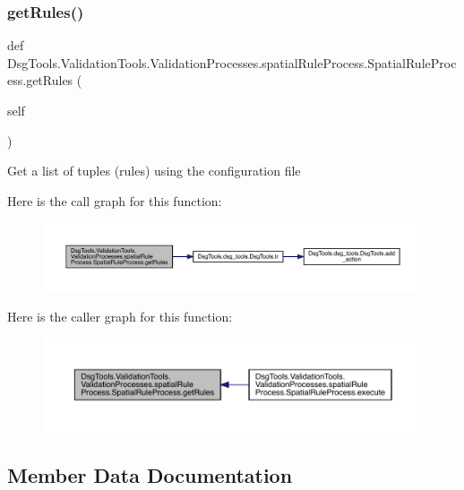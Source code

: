 \subsubsection{\texorpdfstring{get\+Rules()}{getRules()}}
{\footnotesize\ttfamily def Dsg\+Tools.\+Validation\+Tools.\+Validation\+Processes.\+spatial\+Rule\+Process.\+Spatial\+Rule\+Process.\+get\+Rules (\begin{DoxyParamCaption}\item[{}]{self }\end{DoxyParamCaption})}

\begin{DoxyVerb}Get a list of tuples (rules) using the configuration file
\end{DoxyVerb}
 Here is the call graph for this function\+:
\nopagebreak
\begin{figure}[H]
\begin{center}
\leavevmode
\includegraphics[width=350pt]{class_dsg_tools_1_1_validation_tools_1_1_validation_processes_1_1spatial_rule_process_1_1_spatial_rule_process_a21613a30ab73453e3d72c0553ac1f2d6_cgraph}
\end{center}
\end{figure}
Here is the caller graph for this function\+:
\nopagebreak
\begin{figure}[H]
\begin{center}
\leavevmode
\includegraphics[width=350pt]{class_dsg_tools_1_1_validation_tools_1_1_validation_processes_1_1spatial_rule_process_1_1_spatial_rule_process_a21613a30ab73453e3d72c0553ac1f2d6_icgraph}
\end{center}
\end{figure}


\subsection{Member Data Documentation}
\mbox{\label{class_dsg_tools_1_1_validation_tools_1_1_validation_processes_1_1spatial_rule_process_1_1_spatial_rule_process_a7729eebf106a9d533d8b31826dba8673}} 
